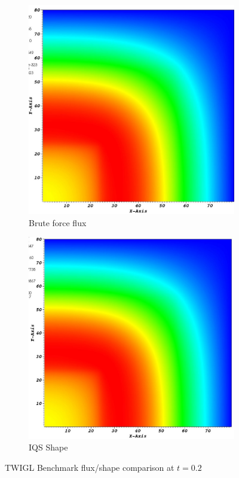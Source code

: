 \documentclass[12pt]{article}
\begin{document}
\begin{figure}[!htbp]
\begin{center}
\begin{subfigure}[!htbp]{0.4\textwidth}
\includegraphics[width=\textwidth]{figures/ndiff_ramp_flux.jpg}
\caption{Brute force flux}
\end{subfigure}
\quad
\begin{subfigure}[!htbp]{0.4\textwidth}
\includegraphics[width=\textwidth]{figures/iqs_ramp_shape.jpg}
\caption{IQS Shape}
\end{subfigure}
\caption{TWIGL Benchmark flux/shape comparison at $t=0.2$}
\label{fig:TWIGL_plots}
\end{center}
\end{figure}
\end{document}
